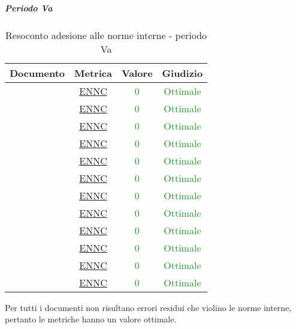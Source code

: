 						\subparagraph{Periodo Va}
						
						\begin{table}[H]
							\centering
							\small
							\begin{tabular}{c | c | c | c}
								\hline
								\textbf{Documento} & \textbf{Metrica}    & \textbf{Valore} & \textbf{Giudizio} \\ \hline
								\pdpv        & \hyperref[MLEC]{ENNC} & \textcolor{ForestGreen}{0} & \textcolor{ForestGreen}{Ottimale} \\
								\pdqv        & \hyperref[MLEC]{ENNC} & \textcolor{ForestGreen}{0} & \textcolor{ForestGreen}{Ottimale} \\
								\ndpv        & \hyperref[MLEC]{ENNC} & \textcolor{ForestGreen}{0} & \textcolor{ForestGreen}{Ottimale} \\
								\adrv        & \hyperref[MLEC]{ENNC}  & \textcolor{ForestGreen}{0} & \textcolor{ForestGreen}{Ottimale} \\
								\stv		& \hyperref[MLEC]{ENNC}  & \textcolor{ForestGreen}{0} & \textcolor{ForestGreen}{Ottimale} \\
								\glv       & \hyperref[MLEC]{ENNC} & \textcolor{ForestGreen}{0} & \textcolor{ForestGreen}{Ottimale} \\
								\ddpv        & \hyperref[MLEC]{ENNC} & \textcolor{ForestGreen}{0} & \textcolor{ForestGreen}{Ottimale} \\
								\manutv        & \hyperref[MLEC]{ENNC} & \textcolor{ForestGreen}{0} & \textcolor{ForestGreen}{Ottimale} \\
								\manmanv        & \hyperref[MLEC]{ENNC} & \textcolor{ForestGreen}{0} & \textcolor{ForestGreen}{Ottimale} \\
								\vnovei       & \hyperref[MLEC]{ENNC}& \textcolor{ForestGreen}{0} & \textcolor{ForestGreen}{Ottimale} \\
								\vcinquee       & \hyperref[MLEC]{ENNC}& \textcolor{ForestGreen}{0} & \textcolor{ForestGreen}{Ottimale} \\
								\vseie       & \hyperref[MLEC]{ENNC}& \textcolor{ForestGreen}{0} & \textcolor{ForestGreen}{Ottimale} \\
							\end{tabular}
							\caption{Resoconto adesione alle norme interne - periodo Va}
							\label{tab_resoconto_adesione_alle_norme_interne_PVA}
						\end{table}
					
						Per tutti i documenti non risultano errori residui che violino le norme interne, pertanto le metriche hanno un valore ottimale.
						
